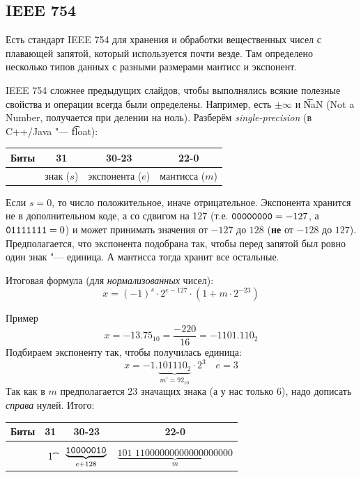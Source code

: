 \subsection{IEEE 754}
\begin{frame}
\end{frame}

\begin{frame}
	Есть стандарт IEEE 754 для хранения и обработки вещественных чисел с плавающей запятой, который используется почти везде.
	Там определено несколько типов данных с разными размерами мантисс и экспонент.

	IEEE 754 сложнее предыдущих слайдов, чтобы выполнялись всякие полезные свойства и операции всегда были определены.
	Например, есть $\pm \infty$ и \t{NaN} (Not a Number, получается при делении на ноль).
	Разберём \textit{single-precision} (в C++/Java "--- \t{float}):

	\begin{center}
		\begin{tabular}{|r|c|c|c|}
			\hline
			Биты & 31 & 30-23 & 22-0 \\\hline
			& знак ($s$) & экспонента ($e$) & мантисса ($m$) \\\hline
		\end{tabular}
	\end{center}
	Если $s=0$, то число положительное, иначе отрицательное.
	Экспонента хранится не в дополнительном коде, а со сдвигом на 127 (т.е. $\t{0000 0000}=-127$, а $\t{0111 1111}=0$)
	и может принимать значения от $-127$ до $128$ (\textbf{не} от $-128$ до $127$).
	Предполагается, что экспонента подобрана так, чтобы перед запятой был ровно один знак "--- единица.
	А мантисса тогда хранит все остальные.

	Итоговая формула (для \textit{нормализованных} чисел):
	\[
		x = (-1)^s \cdot 2^{e-127} \cdot (1 + m \cdot 2^{-23})
	\]
\end{frame}

\begin{frame}{Пример}
	\[
		x = -13.75_{10} = \frac{-220}{16} = -1101.110_2
	\]
	Подбираем экспоненту так, чтобы получилась единица:
	\[
		x = -1.\underbrace{101110_2}_{m'=92_{10}} \cdot 2^3 \quad e=3
	\]
	Так как в $m$ предполагается 23 значащих знака (а у нас только 6), надо дописать \textit{справа} нулей.
	Итого:
	\begin{center}
		\begin{tabular}{|r|c|c|c|}
			\hline
			Биты & 31 & 30-23 & 22-0 \\\hline
			& \t{1} & $\underbrace{\t{100 0001 0}}_{e+128}$ & $\underbrace{\textit{101 110}0 0000 0000 0000 0000}_{m}$ \\\hline
		\end{tabular}
	\end{center}	
\end{frame}

